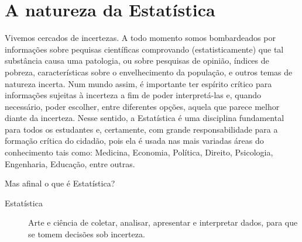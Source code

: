 
\renewcommand\chapterillustration{./abertura-estatistica1}%
\renewcommand\chapterwhat{Especificidade do pensamento estatístico a partir de problemas. Conceitos: população e amostra, parâmetro e estimador. Variáveis estatísticas e suas classificações. Organização dos dados em tabelas de frequências. Representações gráficas adequadas para os diferentes tipos de variáveis. Noções básicas de amostragem.}
\renewcommand\chapterbecause{A Estatística está presente no mundo contemporâneo e chega aos cidadãos em todos os
meios de comunicação. Diariamente somos confrontados com informações estatísticas
sobre temas como Economia, Educação, Esportes, Saúde, Meio-Ambiente, entre outros.
Tais informações orientam decisões em nossas vidas pessoais e permitem-nos exercer
nossas responsabilidades como cidadãos. Um conhecimento básico de Estatística é
fundamental na formação do cidadão para que este possa, de forma competente, apreciar
e criticar argumentos baseados em dados.} 
\chapter{A natureza da Estatística}
\label{\detokenize{PE103:a-natureza-da-estatistica}}\label{\detokenize{PE103::doc}}


\label{\detokenize{PE103-0:explorando-compreendendo-a-natureza-da-estatistica}}\label{\detokenize{PE103-0::doc}}\label{\detokenize{PE103-0:cap-a-natureza-da-estatistica}}
Vivemos cercados de incertezas. A todo momento somos bombardeados por informações sobre pequisas científicas comprovando (estatisticamente) que tal substância causa uma patologia, ou sobre pesquisas de opinião, índices de pobreza, características sobre o envelhecimento da população, e outros temas de natureza incerta. Num mundo assim, é importante ter espírito crítico para informações sujeitas à incerteza a fim de poder interpretá-las e, quando necessário, poder escolher, entre diferentes opções, aquela que parece melhor diante da incerteza.  Nesse sentido, a Estatística é uma disciplina fundamental para todos os estudantes e, certamente, com grande responsabilidade para a formação crítica do cidadão, pois ela é usada nas mais variadas áreas do conhecimento tais como: Medicina, Economia, Política, Direito, Psicologia, Engenharia, Educação, entre outras.

Mas afinal o que é Estatística?
\begin{description}
\item[{Estatística}] \leavevmode{}\label{\detokenize{PE103-0:term-estatistica}}
Arte e ciência de coletar, analisar, apresentar e interpretar dados, para que se tomem decisões sob incerteza.
\end{description}

